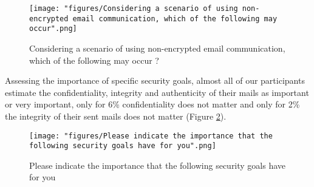 \begin{figure}
	\texttt{[image: "figures/Considering a scenario of using non-encrypted email communication, which of the following may occur".png]}
	\centering
	\caption{Considering a scenario of using non-encrypted email communication, which of the following may occur ?}
	\label{fig:scenario}
\end{figure}
Assessing the importance of specific security goals, almost all of our participants estimate the confidentiality, integrity and authenticity of their mails as important or very important, only for 6\% confidentiality does not matter and only for 2\% the integrity of their sent mails does not matter (Figure \ref{fig:goals}).
\newline
\newline
\begin{figure}
	\texttt{[image: "figures/Please indicate the importance that the following security goals have for you".png]}
	\centering
	\caption{Please indicate the importance that the following security goals have for you}
	\label{fig:goals}
\end{figure}